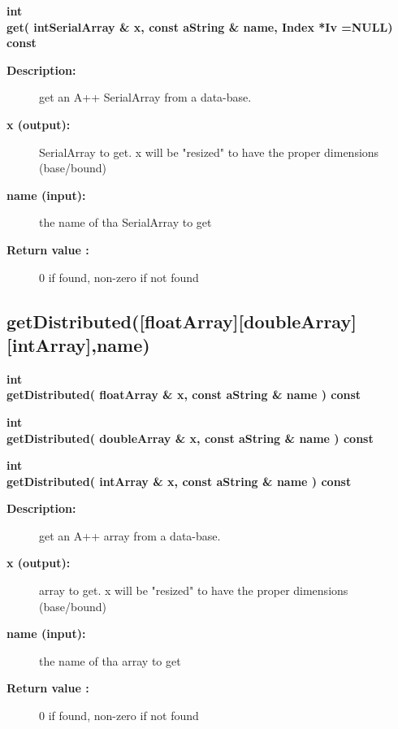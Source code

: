 
\begin{flushleft} \textbf{%
int  \\ 
\settowidth{\GenericDataBaseIncludeArgIndent}{get(}%
get( intSerialArray \& x, const aString \& name, Index *Iv  =NULL) const
}\end{flushleft}
    
\begin{description}
\item[{\bf Description:}]  get an A++ SerialArray from a data-base.
\item[{\bf x (output):}]  SerialArray to get. x will be "resized" to have the proper dimensions (base/bound)
\item[{\bf name (input):}]  the name of tha SerialArray to get
\item[{\bf Return value :}]  0 if found, non-zero if not found   
    
\end{description}
\subsection{getDistributed([floatArray][doubleArray][intArray],name) }
 
\begin{flushleft} \textbf{%
int  \\ 
\settowidth{\GenericDataBaseIncludeArgIndent}{getDistributed(}%
getDistributed( floatArray \& x, const aString \& name ) const
}\end{flushleft}
    

 
\begin{flushleft} \textbf{%
int  \\ 
\settowidth{\GenericDataBaseIncludeArgIndent}{getDistributed(}%
getDistributed( doubleArray \& x, const aString \& name ) const
}\end{flushleft}
    

 
\begin{flushleft} \textbf{%
int  \\ 
\settowidth{\GenericDataBaseIncludeArgIndent}{getDistributed(}%
getDistributed( intArray \& x, const aString \& name ) const
}\end{flushleft}
    
\begin{description}
\item[{\bf Description:}]  get an A++ array from a data-base.
\item[{\bf x (output):}]  array to get. x will be "resized" to have the proper dimensions (base/bound)
\item[{\bf name (input):}]  the name of tha array to get
\item[{\bf Return value :}]  0 if found, non-zero if not found   
    
\end{description}
